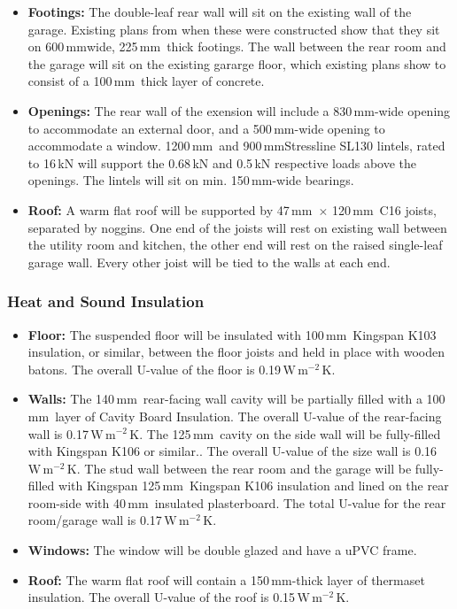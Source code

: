\documentclass{extension}
\newcommand{\mm}{\,$\mathrm{mm}$}
\newcommand{\uunit}{\,$\mathrm{W\,m^{-2}\,K}$}
\begin{document}
\begin{itemize}
  \item {\bf Footings:} The double-leaf rear wall will sit on the existing wall of the garage. Existing plans from when these were constructed show that they sit on 600\mm wide, 225\mm\ thick footings. The wall between the rear room and the garage will sit on the existing gararge floor, which existing plans show to consist of a 100\mm\ thick layer of concrete.
  \item {\bf Openings:} The rear wall of the exension will include a 830\mm -wide opening to accommodate an external door, and a 500\mm -wide opening to accommodate a window. 1200\mm\ and 900\mm Stressline SL130 lintels\cite{esteel}, rated to 16\,kN will support the 0.68\,kN and 0.5\,kN respective loads above the openings. The lintels will sit on min. 150\mm -wide bearings.
  \item {\bf Roof:} A warm flat roof will be supported by 47\mm\ $\times$ 120\mm\ C16 joists, separated by noggins. One end of the joists will rest on existing wall between the utility room and kitchen, the other end will rest on the raised single-leaf garage wall. Every other joist will be tied to the walls at each end.
\end{itemize}

\subsubsection{Heat and Sound Insulation}
\begin{itemize}
  \item {\bf Floor:} The suspended floor will be insulated with 100\mm\ Kingspan K103 insulation, or similar, between the floor joists and held in place with wooden batons. The overall U-value of the floor is 0.19\uunit .
  \item {\bf Walls:} The 140\mm\ rear-facing wall cavity will be partially filled with a 100\mm\ layer of Cavity Board Insulation.\cite{uw1ins} The overall U-value of the rear-facing wall is 0.17\uunit . The 125\mm\ cavity on the side wall will be fully-filled with Kingspan K106 or similar.\cite{uw2ins}. The overall U-value of the size wall is 0.16\uunit. The stud wall between the rear room and the garage will be fully-filled with Kingspan 125\mm\ Kingspan K106\cite{uw2ins} insulation and lined on the rear room-side with 40\mm\ insulated plasterboard.\cite{uw3ins} The total U-value for the rear room/garage wall is 0.17\uunit .
  \item {\bf Windows:} The window will be double glazed and have a uPVC frame.
  \item {\bf Roof:} The warm flat roof will contain a 150\mm -thick layer of thermaset insulation.\cite{erins} The overall U-value of the roof is 0.15\uunit .
\end{itemize}
\end{document}
